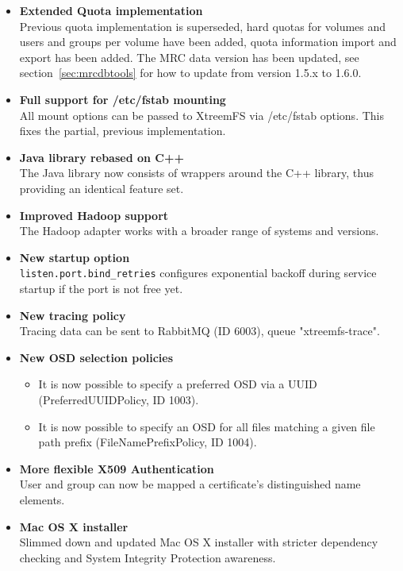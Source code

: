 \documentclass[a4paper,10pt]{book}
\begin{document}
\begin{itemize}
  \item \textbf{Extended Quota implementation}\\
      Previous quota implementation is superseded, hard quotas for volumes
      and users and groups per volume have been added, quota information
      import and export has been added. The MRC data version has been updated,
      see section~\ref{sec:mrcdbtools} for how to update from
      version 1.5.x to 1.6.0.
  \item \textbf{Full support for /etc/fstab mounting}\\
      All mount options can be passed to XtreemFS via /etc/fstab options.
      This fixes the partial, previous implementation.
  \item \textbf{Java library rebased on C++}\\
      The Java library now consists of wrappers around the C++ library,
      thus providing an identical feature set.
  \item \textbf{Improved Hadoop support}\\
      The Hadoop adapter works with a broader range of systems and versions.
  \item \textbf{New startup option}\\
      \texttt{listen.port.bind\_retries} configures exponential backoff during
      service startup if the port is not free yet.
  \item \textbf{New tracing policy}\\
      Tracing data can be sent to RabbitMQ (ID 6003), queue "xtreemfs-trace".
  \item \textbf{New OSD selection policies}
      \begin{itemize}
       \item It is now possible to specify a preferred OSD via a UUID (PreferredUUIDPolicy, ID 1003).
       \item It is now possible to specify an OSD for all files matching a given file path prefix (FileNamePrefixPolicy, ID 1004).
      \end{itemize}      
  \item \textbf{More flexible X509 Authentication}\\
      User and group can now be mapped a certificate's distinguished name elements.
  \item \textbf{Mac OS X installer}\\
      Slimmed down and updated Mac OS X installer with stricter dependency
      checking and System Integrity Protection awareness.

\end{itemize}
\end{document}
